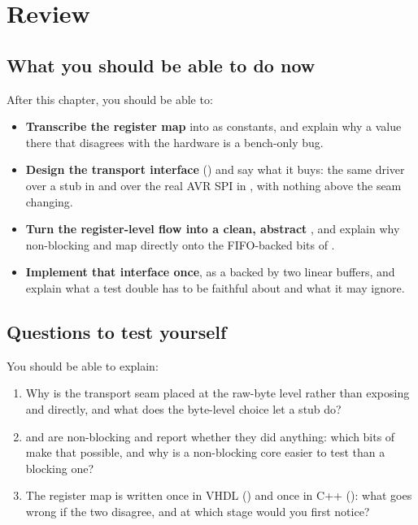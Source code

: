 
\section{Review}
\label{c6:sec:review}

\subsection*{What you should be able to do now}
After this chapter, you should be able to:
\begin{itemize}
  \item \textbf{Transcribe the register map} into  as 
    constants, and explain why a value there that disagrees with the hardware is a bench-only bug.
  \item \textbf{Design the transport interface} () and say what it
    buys: the same driver over a stub in  and over the real AVR SPI in , with
    nothing above the seam changing.
  \item \textbf{Turn the register-level flow into a clean, abstract }, and explain
    why non-blocking  and  map directly onto the FIFO-backed 
    bits of .
  \item \textbf{Implement that interface once}, as a  backed by two linear buffers, and
    explain what a test double has to be faithful about and what it may ignore.
\end{itemize}

\subsection*{Questions to test yourself}
You should be able to explain:
\begin{enumerate}
  \item Why is the transport seam placed at the raw-byte level rather than exposing 
    and  directly, and what does the byte-level choice let a stub do?
  \item {} and  are non-blocking and report whether they did anything: which
     bits of  make that possible, and why is a non-blocking core easier to
    test than a blocking one?
  \item The register map is written once in VHDL () and once in C++
    (): what goes wrong if the two disagree, and at which stage would you
    first notice?
\end{enumerate}

